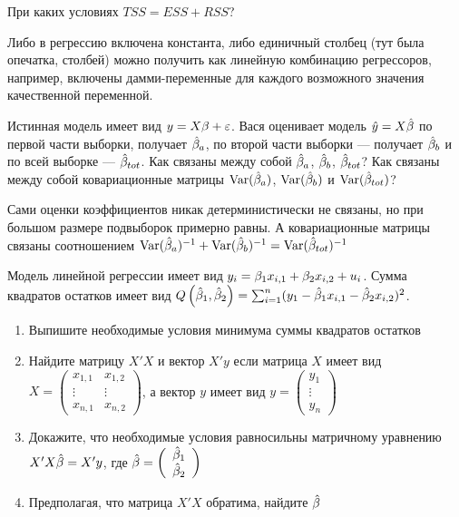 \begin{problem}
При каких условиях $TSS=ESS+RSS$?
\end{problem}
\begin{solution}
Либо в регрессию включена константа, либо единичный столбец (тут была опечатка, столбей) можно получить как линейную комбинацию регрессоров, например, включены дамми-переменные для каждого возможного значения качественной переменной.
\end{solution}




\begin{problem}
Истинная модель имеет вид $y=X\beta +\varepsilon$. Вася оценивает модель $\hat{y}=X \hat{\beta}$ по первой части выборки, получает $\hat{\beta}_a$, по второй части выборки --- получает $\hat{\beta}_b$ и по всей выборке --- $\hat{\beta}_{tot}$. Как связаны между собой $\hat{\beta}_a$, $\hat{\beta}_b$, $\hat{\beta}_{tot}$? Как связаны между собой ковариационные матрицы $\operatorname{Var}(\hat{\beta}_a)$,  $\operatorname{Var}(\hat{\beta}_b)$ и  $\operatorname{Var}(\hat{\beta}_{tot})$?
\end{problem}

\begin{solution}
Сами оценки коэффициентов никак детерминистически не связаны, но при большом размере подвыборок примерно равны. А ковариационные матрицы связаны соотношением $\operatorname{Var}(\hat{\beta}_a)^{-1}+\operatorname{Var}(\hat{\beta}_b)^{-1}=\operatorname{Var}(\hat{\beta}_{tot})^{-1}$ 
\end{solution}




\begin{problem}
Модель линейной регрессии имеет вид $y_i=\beta_1 x_{i,1}+\beta_2 x_{i,2} + u_i$.
Сумма квадратов остатков имеет вид $Q\left(\hat{\beta}_1,\hat{\beta}_2\right)=\sum_{i=1}^n (y_1-\hat{\beta}_1 x_{i,1}-\hat{\beta}_2 x_{i,2})^2$.
\begin{enumerate}
\item Выпишите необходимые условия минимума суммы квадратов остатков
\item Найдите матрицу $X'X$ и вектор $X'y$ если матрица $X$ имеет вид
$X=
\left(
\begin{array}{cc}
x_{1,1} & x_{1,2} \\
\vdots & \vdots \\
x_{n,1} & x_{n,2}
\end{array}
\right)
$,
а вектор $y$ имеет вид
$y=
\left(
\begin{array}{c}
y_1 \\
\vdots \\
y_n
\end{array}
\right)
$
\item Докажите, что необходимые условия равносильны матричному уравнению $X'X\hat{\beta}=X'y$, где
$\hat{\beta}=
\left(
\begin{array}{c}
\hat{\beta}_1 \\
\hat{\beta}_2
\end{array}
\right)
$
\item Предполагая, что матрица $X'X$ обратима, найдите $\hat{\beta}$
\end{enumerate}
\end{problem}
\begin{solution}
\end{solution}



